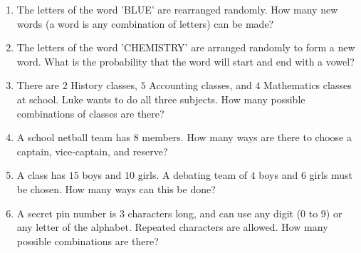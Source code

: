 \begin{eocexercises}{}
\begin{enumerate}
\item The letters of the word 'BLUE' are rearranged randomly. How many new words (a word is any combination of letters) can be made?

\item The letters of the word 'CHEMISTRY' are arranged randomly to form a new word. What is the probability that the word will start and end with a vowel?

\item There are $2$ History classes, $5$ Accounting classes, and $4$ Mathematics classes at school. Luke wants to do all three subjects. How many possible combinations of classes are there?

\item A school netball team has $8$ members. How many ways are there to choose a captain, vice-captain, and reserve?

\item A class has $15$ boys and $10$ girls. A debating team of $4$ boys and $6$ girls must be chosen. How many ways can this be done?

\item A secret pin number is $3$ characters long, and can use any digit ($0$ to $9$) or any letter of the alphabet. Repeated characters are allowed. How many possible combinations are there?


\end{enumerate}









\end{eocexercises}%
